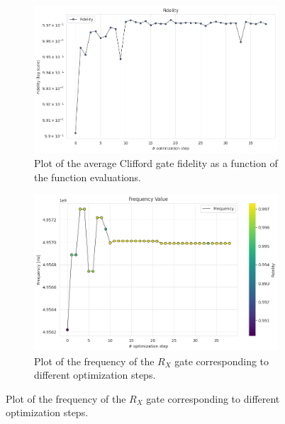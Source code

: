 \begin{figure}[h!]
    \centering
    \begin{subfigure}[t]{0.45\textwidth}
        \includegraphics[width=\textwidth]{figures/png/RB_optimization/NM/post_ft_true/NM_fid.png}
        \caption{Plot of the average Clifford gate fidelity as a function of the function evaluations.}
        \label{NM_true_fig:fidelity}
    \end{subfigure}
    \hfill
    \begin{subfigure}[t]{0.45\textwidth}
        \includegraphics[width=\textwidth]{figures/png/RB_optimization/NM/post_ft_true/frequency.png}
        \caption{Plot of the frequency of the $R_X$ gate corresponding to different optimization steps.}
        \label{NM_true_fig:frequency}
    \end{subfigure}

    \vspace{0.5cm}


\end{figure}
